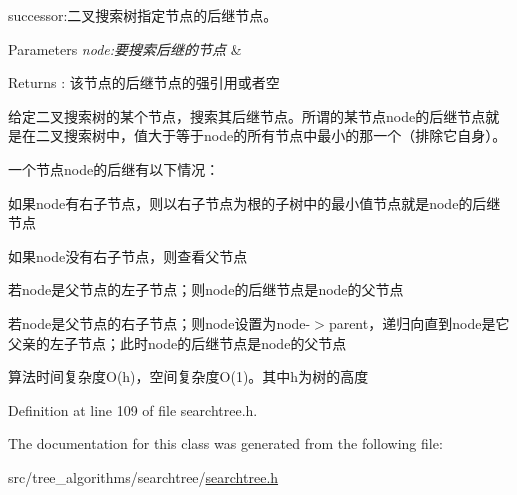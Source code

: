 successor\+:二叉搜索树指定节点的后继节点。 


\begin{DoxyParams}{Parameters}
{\em node\+:要搜索后继的节点} & \\
\hline
\end{DoxyParams}
\begin{DoxyReturn}{Returns}
\+: 该节点的后继节点的强引用或者空
\end{DoxyReturn}
给定二叉搜索树的某个节点，搜索其后继节点。所谓的某节点{\ttfamily node}的后继节点就是在二叉搜索树中，值大于等于{\ttfamily node}的所有节点中最小的那一个（排除它自身）。

一个节点{\ttfamily node}的后继有以下情况：


\begin{DoxyItemize}
\item 如果{\ttfamily node}有右子节点，则以右子节点为根的子树中的最小值节点就是{\ttfamily node}的后继节点
\item 如果{\ttfamily node}没有右子节点，则查看父节点
\begin{DoxyItemize}
\item 若{\ttfamily node}是父节点的左子节点；则{\ttfamily node}的后继节点是{\ttfamily node}的父节点
\item 若{\ttfamily node}是父节点的右子节点；则{\ttfamily node}设置为{\ttfamily node-\/$>$parent}，递归向直到{\ttfamily node}是它父亲的左子节点；此时{\ttfamily node}的后继节点是{\ttfamily node}的父节点
\end{DoxyItemize}
\end{DoxyItemize}

算法时间复杂度\+O(h)，空间复杂度\+O(1)。其中h为树的高度 

Definition at line 109 of file searchtree.\+h.



The documentation for this class was generated from the following file\+:\begin{DoxyCompactItemize}
\item 
src/tree\+\_\+algorithms/searchtree/\hyperlink{searchtree_8h}{searchtree.\+h}\end{DoxyCompactItemize}
